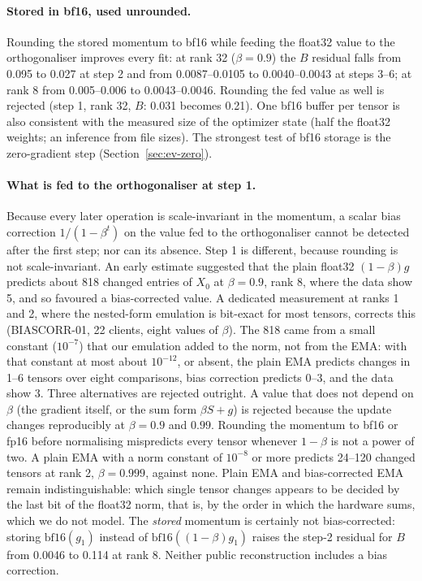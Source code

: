 \documentclass[11pt]{article}
\begin{document}
\paragraph{Stored in bf16, used unrounded.} Rounding the stored momentum to bf16 while feeding the
float32 value to the orthogonaliser improves every fit: at rank 32 ($\beta=0.9$) the $B$ residual
falls from 0.095 to 0.027 at step 2 and from 0.0087--0.0105 to 0.0040--0.0043 at steps 3--6; at rank 8
from 0.005--0.006 to 0.0043--0.0046. Rounding the fed value as well is rejected (step 1, rank 32,
$B$: 0.031 becomes 0.21). One bf16 buffer per tensor is also consistent with the measured size of the
optimizer state (half the float32 weights; an inference from file sizes). The strongest test of
bf16 storage is the zero-gradient step (Section~\ref{sec:ev-zero}).

\paragraph{What is fed to the orthogonaliser at step 1.} Because every later operation is
scale-invariant in the momentum, a scalar bias correction $1/(1-\beta^t)$ on the value fed to the
orthogonaliser cannot be detected after the first step; nor can its absence. Step 1 is different,
because rounding is not scale-invariant. An early estimate suggested that the plain float32
$(1-\beta)g$ predicts about 818 changed entries of $X_0$ at $\beta=0.9$, rank 8, where the data
show 5, and so favoured a bias-corrected value. A dedicated measurement at ranks 1 and 2, where
the nested-form emulation is bit-exact for most tensors, corrects this (BIASCORR-01, 22 clients,
eight values of $\beta$). The 818 came from a small constant ($10^{-7}$) that our emulation added
to the norm, not from the EMA: with that constant at most about $10^{-12}$, or absent, the plain
EMA predicts changes in 1--6 tensors over eight comparisons, bias correction predicts 0--3, and
the data show 3. Three alternatives are rejected outright. A value that does not depend on $\beta$
(the gradient itself, or the sum form $\beta S+g$) is rejected because the update changes
reproducibly at $\beta=0.9$ and $0.99$. Rounding the momentum to bf16 or fp16 before normalising
mispredicts every tensor whenever $1-\beta$ is not a power of two. A plain EMA with a norm constant
of $10^{-8}$ or more predicts 24--120 changed tensors at rank 2, $\beta=0.999$, against none. Plain
EMA and bias-corrected EMA remain indistinguishable: which single tensor changes appears to be
decided by the last bit of the float32 norm, that is, by the order in which the hardware sums,
which we do not model. The \emph{stored} momentum is certainly not bias-corrected: storing
$\mathrm{bf16}(g_1)$ instead of $\mathrm{bf16}((1-\beta)g_1)$ raises the step-2 residual for $B$
from 0.0046 to 0.114 at rank 8. Neither public reconstruction includes a bias correction.
\end{document}
